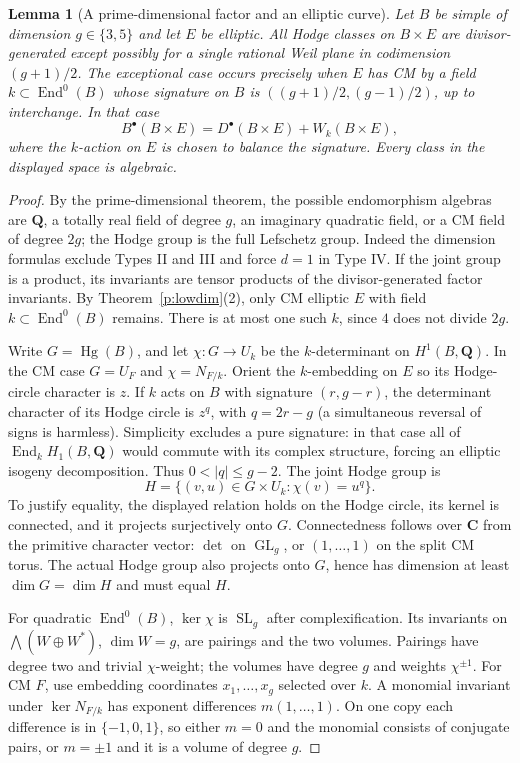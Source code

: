 \documentclass[10pt,reqno]{article}
\theoremstyle{emphasizedplain}
\theoremstyle{emphasizeddefinition}
\theoremstyle{emphasizeddefinition}
\newtheorem{prelemma}{Lemma}
\DeclareMathOperator{\End}{End}
\DeclareMathOperator{\Hg}{Hg}
\DeclareMathOperator{\GL}{GL}
\DeclareMathOperator{\SL}{SL}
\newcommand{\Q}{\mathbf Q}
\newcommand{\C}{\mathbf C}
\begin{document}
\begin{prelemma}[A prime-dimensional factor and an elliptic curve]
\label{p:prime-ell}
Let $B$ be simple of dimension $g\in\{3,5\}$ and let $E$ be elliptic.
All Hodge classes on $B\times E$ are divisor-generated except possibly
for a single rational Weil plane in codimension $(g+1)/2$.
The exceptional case occurs precisely when $E$ has CM by a field
$k\subset\End^0(B)$ whose signature on $B$ is
$((g+1)/2,(g-1)/2)$, up to interchange. In that case
\[
 B^\bullet(B\times E)=D^\bullet(B\times E)+W_k(B\times E),
\]
where the $k$-action on $E$ is chosen to balance the signature.
Every class in the displayed space is algebraic.
\end{prelemma}
\begin{proof}
By the prime-dimensional theorem, the possible endomorphism algebras are
$\Q$, a totally real field of degree $g$, an imaginary quadratic field,
or a CM field of degree $2g$; the Hodge group is the full Lefschetz group.
Indeed the dimension formulas exclude Types II and III and force $d=1$
in Type IV. If the joint group is a product, its invariants are tensor
products of the divisor-generated factor invariants.
By Theorem~\ref{p:lowdim}(2), only CM elliptic $E$ with field
$k\subset\End^0(B)$ remains. There is at most one such $k$, since
$4$ does not divide $2g$.

Write $G=\Hg(B)$, and let $\chi:G\to U_k$ be the $k$-determinant on
$H^1(B,\Q)$. In the CM case $G=U_F$ and $\chi=N_{F/k}$.
Orient the $k$-embedding on $E$ so its Hodge-circle character is $z$.
If $k$ acts on $B$ with signature $(r,g-r)$, the determinant character
of its Hodge circle is $z^q$, with $q=2r-g$ (a simultaneous reversal of
signs is harmless). Simplicity excludes a pure signature: in that case
all of $\End_k H_1(B,\Q)$ would commute with its complex structure,
forcing an elliptic isogeny decomposition. Thus $0<|q|\leq g-2$.
The joint Hodge group is
\[
 H=\{(v,u)\in G\times U_k:\chi(v)=u^q\}.
\]
To justify equality, the displayed relation holds on the Hodge circle,
its kernel is connected, and it projects surjectively onto $G$.
Connectedness follows over $\C$ from the primitive character vector:
$\det$ on $\GL_g$, or $(1,\ldots,1)$ on the split CM torus.
The actual Hodge group also projects onto $G$, hence has dimension at
least $\dim G=\dim H$ and must equal $H$.

For quadratic $\End^0(B)$, $\ker\chi$ is $\SL_g$ after complexification.
Its invariants on $\bigwedge(W\oplus W^*)$, $\dim W=g$, are pairings
and the two volumes. Pairings have degree two and trivial $\chi$-weight;
the volumes have degree $g$ and weights $\chi^{\pm1}$.
For CM $F$, use embedding coordinates $x_1,\ldots,x_g$ selected over
$k$. A monomial invariant under $\ker N_{F/k}$ has exponent differences
$m(1,\ldots,1)$. On one copy each difference is in $\{-1,0,1\}$,
so either $m=0$ and the monomial consists of conjugate pairs, or $m=\pm1$
and it is a volume of degree $g$.


\end{proof}
\end{document}
